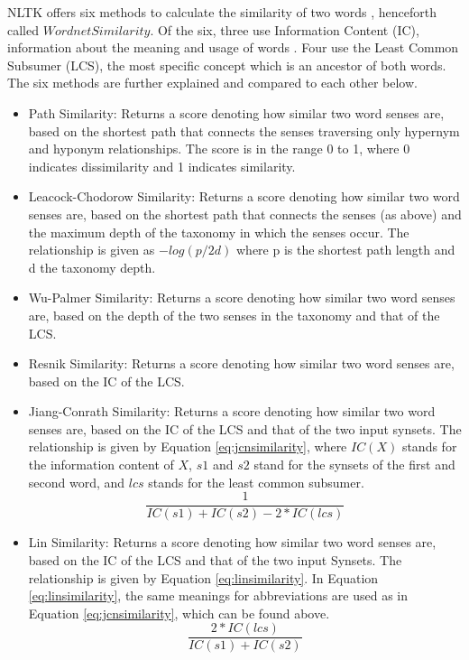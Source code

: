 \documentclass{article}
\begin{document}
NLTK offers six methods to calculate the similarity of two words \citep{pedersen2004wordnet}, henceforth called $\textit{WordnetSimilarity}$. Of the six, three use Information Content (IC), information about the meaning and usage of words \cite{seco2004intrinsic}. Four use the Least Common Subsumer (LCS), the most specific concept which is an ancestor of both words. The six methods are further explained and compared to each other below.
\begin{itemize}
	\item Path Similarity: Returns a score denoting how similar two word senses are, based on the shortest path that connects the senses traversing only hypernym and hyponym relationships. The score is in the range 0 to 1, where 0 indicates dissimilarity and 1 indicates similarity.
	\item Leacock-Chodorow Similarity: Returns a score denoting how similar two word senses are, based on the shortest path that connects the senses (as above) and the maximum depth of the taxonomy in which the senses occur. The relationship is given as \(-log(p/2d)\) where p is the shortest path length and d the taxonomy depth. %
	\item Wu-Palmer Similarity: Returns a score denoting how similar two word senses are, based on the depth of the two senses in the taxonomy and that of the LCS.
	\item Resnik Similarity: Returns a score denoting how similar two word senses are, based on the IC of the LCS.
	\item Jiang-Conrath Similarity: Returns a score denoting how similar two word senses are, based on the IC of the LCS and that of the two input synsets. The relationship is given by Equation \ref{eq:jcnsimilarity}, where $IC(X)$ stands for the information content of $X$, $s1$ and $s2$ stand for the synsets of the first and second word, and $lcs$ stands for the least common subsumer.
\begin{equation} \label{eq:jcnsimilarity}
	\frac{1} {IC(s1) + IC(s2) - 2 * IC(lcs)}
\end{equation}
	\item Lin Similarity: Returns a score denoting how similar two word senses are, based on the IC of the LCS and that of the two input Synsets. The relationship is given by Equation \ref{eq:linsimilarity}. In Equation \ref{eq:linsimilarity}, the same meanings for abbreviations are used as in Equation \ref{eq:jcnsimilarity}, which can be found above.
\begin{equation} \label{eq:linsimilarity}
	\frac{2 * IC(lcs)} {IC(s1) + IC(s2)} 
\end{equation} 
\end{itemize}
\end{document}
